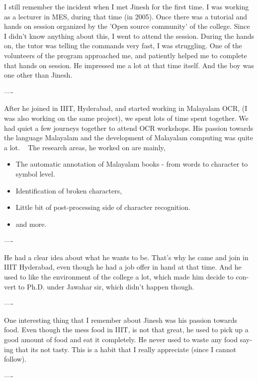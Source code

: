 \begin{english}
I still remember the incident when I met Jinesh for the first time. I was working as a lecturer in MES, during that time (in 2005). Once there was a tutorial and hands on session organized by the 'Open source community' of the college. Since I didn’t know anything about this, I went to attend the session. During the hands on, the tutor was telling the commands very fast, I was struggling. One of the volunteers of the program approached me, and patiently helped me to complete that hands on session. He impressed me a lot at that time itself. And the boy was one other than Jinesh.
\begin{center}
---- 
\end{center}
After he joined in IIIT, Hyderabad, and started working in Malayalam OCR, (I was also working on the same project), we spent lots of time spent together. We had quiet a few journeys together to attend OCR workshops. His passion towards the language Malayalam and the development of Malayalam computing was quite a lot.
 
The research areas, he worked on are mainly,
\begin{itemize}
\item The automatic annotation of Malayalam books - from words to character to symbol level.
\item Identification of broken characters,
\item Little bit of post-processing side of character recognition.
\item and more.
\end{itemize}
\begin{center}
---- 
\end{center}
He had a clear idea about what he wants to be. That’s why he came and join in IIIT Hyderabad, even though he had a job offer in hand at that time. And he used to like the environment of the college a lot, which made him decide to convert to Ph.D. under Jawahar sir, which didn’t happen though.
\begin{center}
---- 
\end{center}
One interesting thing that I remember about Jinesh was his passion towards food. Even though the mess food in IIIT, is not that great, he used to pick up a good amount of food and eat it completely. He never used to waste any food saying that its not tasty. This is a habit that I really appreciate (since I cannot follow).
\begin{center}
---- 
\end{center}

\end{english}
